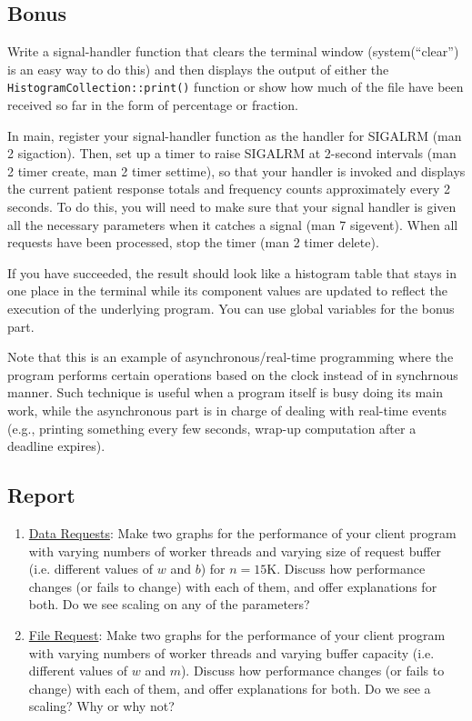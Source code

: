 \documentclass[12pt]{article}
\begin{document}
\subsection*{Bonus}	
Write a signal-handler function that clears the terminal window (system(``clear'') is an easy way to do this) and then displays the output of either the \texttt{HistogramCollection::print()} function or show how much of the file have been received so far in the form of percentage or fraction. 
	
In main, register your signal-handler function as the handler for SIGALRM (man 2 sigaction). Then, set up a timer to raise SIGALRM at 2-second intervals (man 2 timer create, man 2 timer settime), so that your handler is invoked and displays the current patient response totals and frequency counts approximately every 2 seconds. To do this, you will need to make sure that your signal handler is given all the necessary parameters when it catches a signal (man 7 sigevent). When all requests have been processed, stop the timer (man 2 timer delete).

	
If you have succeeded, the result should look like a histogram table that stays in one place in the terminal while its component values are updated to reflect the execution of the underlying program.
You can use global variables for the bonus part.

Note that this is an example of asynchronous/real-time programming where the program performs certain operations based on the clock instead of in synchrnous manner. Such technique is useful when a program itself is busy doing its main work, while the asynchronous part is in charge of dealing with real-time events (e.g., printing something every few seconds, wrap-up computation after a deadline expires). 

\subsection*{Report}	

\begin{enumerate}
	
	\item \underline{Data Requests}: Make two graphs for the performance of your client program with varying numbers of worker threads and varying size of request buffer (i.e. different values of $w$ and $b$) for $n = 15$K. Discuss how performance changes (or fails to change) with each of them, and offer explanations for both. Do we see scaling on any of the parameters?
	
	\item \underline{File Request}: Make two graphs for the performance of your client program with varying numbers of worker threads and varying buffer capacity (i.e. different values of $w$ and $m$). Discuss how performance changes (or fails to change) with each of them, and offer explanations for both. Do we see a scaling? Why or why not?
	
\end{enumerate}
\end{document}

